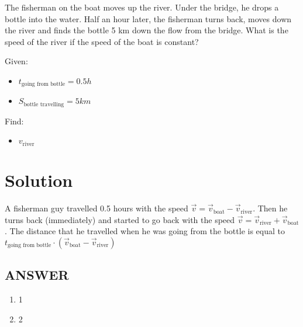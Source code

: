 The fisherman on the boat moves up the river. Under the bridge, he drops a bottle into the water.
Half an hour later, the fisherman turns back, moves down the river and finds the bottle 5 km
down the flow from the bridge. What is the speed of the river if the speed of the boat is constant?

\bigbreak Given: \begin{itemize}
    \item $t_{\text{going from bottle}} = 0.5h$
    \item $S_{\text{bottle travelling}} = 5km$
\end{itemize}

Find: \begin{itemize}
    \item $v_{\text{river}}$
\end{itemize}

\section*{Solution}

A fisherman guy travelled 0.5 hours with the speed $\Vec{v} = \Vec{v}_{\text{boat}} - \Vec{v}_{\text{river}}$.
\bigbreak Then he turns back (immediately) and started to go back with the speed $\Vec{v} = \Vec{v}_{\text{river}} + \Vec{v}_{\text{boat}}$.
\bigbreak The distance that he travelled when he was going from the bottle is equal to $t_{\text{going from bottle}} \cdot (\Vec{v}_{\text{boat}} - \Vec{v}_{\text{river}})$ 



\vfill
\subsection*{ANSWER}
\begin{enumerate}
    \item 1
    \item 2
\end{enumerate}

